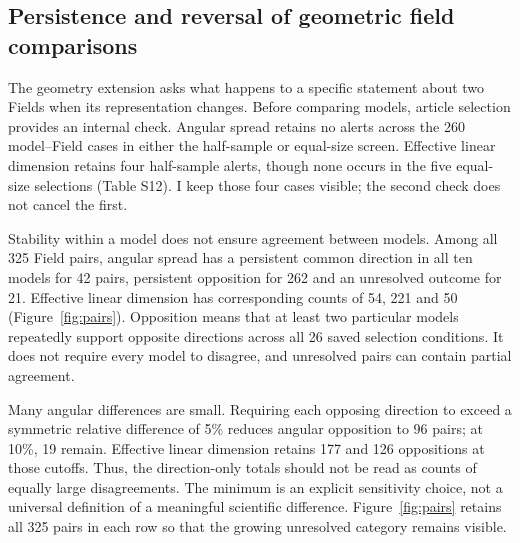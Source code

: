\documentclass[12pt]{article}
\begin{document}
\subsection{Persistence and reversal of geometric field comparisons}
The geometry extension asks what happens to a specific statement about two Fields when its representation changes. Before comparing models, article selection provides an internal check. Angular spread retains no alerts across the 260 model--Field cases in either the half-sample or equal-size screen. Effective linear dimension retains four half-sample alerts, though none occurs in the five equal-size selections (Table S12). I keep those four cases visible; the second check does not cancel the first.

Stability within a model does not ensure agreement between models. Among all 325 Field pairs, angular spread has a persistent common direction in all ten models for 42 pairs, persistent opposition for 262 and an unresolved outcome for 21. Effective linear dimension has corresponding counts of 54, 221 and 50 (Figure~\ref{fig:pairs}). Opposition means that at least two particular models repeatedly support opposite directions across all 26 saved selection conditions. It does not require every model to disagree, and unresolved pairs can contain partial agreement.

Many angular differences are small. Requiring each opposing direction to exceed a symmetric relative difference of 5\% reduces angular opposition to 96 pairs; at 10\%, 19 remain. Effective linear dimension retains 177 and 126 oppositions at those cutoffs. Thus, the direction-only totals should not be read as counts of equally large disagreements. The minimum is an explicit sensitivity choice, not a universal definition of a meaningful scientific difference. Figure~\ref{fig:pairs} retains all 325 pairs in each row so that the growing unresolved category remains visible.

\end{document}
